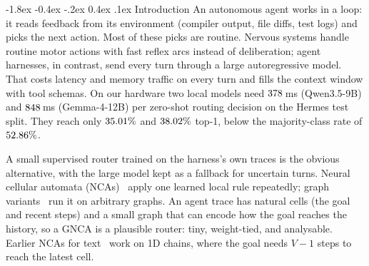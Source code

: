 \documentclass[10pt,twocolumn,letterpaper]{article}
\makeatletter
\renewcommand\section{\@startsection {section}{1}{\z@}%
  {-1.8ex \@plus -0.4ex \@minus -.2ex}%
  {0.4ex \@plus.1ex}%
  {\normalfont\normalsize\bfseries}}
\makeatother
\begin{document}
\section{Introduction}\label{sec:intro}
An autonomous agent works in a loop: it reads feedback from its environment (compiler output, file diffs, test logs) and picks the next action. Most of these picks are routine. Nervous systems handle routine motor actions with fast reflex arcs instead of deliberation; agent harnesses, in contrast, send every turn through a large autoregressive model. That costs latency and memory traffic on every turn and fills the context window with tool schemas. On our hardware two local models need $378$\,ms (Qwen3.5-9B) and $848$\,ms (Gemma-4-12B) per zero-shot routing decision on the Hermes test split. They reach only $35.01\%$ and $38.02\%$ top-1, below the majority-class rate of $52.86\%$.

A small supervised router trained on the harness's own traces is the obvious alternative, with the large model kept as a fallback for uncertain turns. Neural cellular automata (NCAs)~\cite{mordvintsev2020growing} apply one learned local rule repeatedly; graph variants~\cite{grattarola2021learning,gala2023equivariant} run it on arbitrary graphs. An agent trace has natural cells (the goal and recent steps) and a small graph that can encode how the goal reaches the history, so a GNCA is a plausible router: tiny, weight-tied, and analysable. Earlier NCAs for text~\cite{mittal2026textnca} work on 1D chains, where the goal needs $V{-}1$ steps to reach the latest cell.
\end{document}
